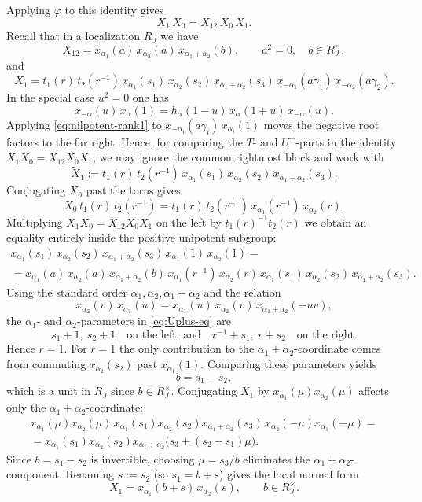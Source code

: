 \documentclass[]{jgcc}
\numberwithin{equation}{section}
\begin{document}
Applying $\varphi$ to this identity gives
\[
X_1\,X_0 = X_{12}\,X_0\,X_1.
\]
Recall that in a localization $R_J$ we have
\[
X_{12}=x_{\alpha_1}(a)\,x_{\alpha_2}(a)\,x_{\alpha_1+\alpha_2}(b),
\qquad a^2=0,\quad b\in R_J^\times,
\]
and
\[
X_1=t_1(r)\,t_2(r^{-1})\,
x_{\alpha_1}(s_1)\,x_{\alpha_2}(s_2)\,x_{\alpha_1+\alpha_2}(s_3)\,
x_{-\alpha_1}(a\gamma_1)\,x_{-\alpha_2}(a\gamma_2).
\]
In the special case $u^2=0$ one has
\begin{equation}\label{eq:nilpotent-rank1}
x_{-\alpha}(u)\,x_{\alpha}(1)
= h_{\alpha}(1-u)\,x_{\alpha}(1+u)\,x_{-\alpha}(u).
\end{equation}
Applying \eqref{eq:nilpotent-rank1} to $x_{-\alpha_i}(a\gamma_i)\,x_{\alpha_i}(1)$ moves the negative root factors to the far right. Hence, for comparing the $T$- and $U^+$-parts in the identity $X_1X_0=X_{12}X_0X_1$, we may ignore the common rightmost block and work with
\[
\widetilde X_1:=t_1(r)\,t_2(r^{-1})\,x_{\alpha_1}(s_1)\,x_{\alpha_2}(s_2)\,x_{\alpha_1+\alpha_2}(s_3).
\]
Conjugating $X_0$ past the torus gives
\[
X_0\,t_1(r)\,t_2(r^{-1})
= t_1(r)\,t_2(r^{-1})\,x_{\alpha_1}(r^{-1})\,x_{\alpha_2}(r).
\]
Multiplying $X_1X_0=X_{12}X_0X_1$ on the left by $t_1(r)^{-1}t_2(r)$
we obtain an equality entirely inside the positive unipotent subgroup:
\begin{multline}\label{eq:Uplus-eq}
x_{\alpha_1}(s_1)\,x_{\alpha_2}(s_2)\,x_{\alpha_1+\alpha_2}(s_3)\,x_{\alpha_1}(1)\,x_{\alpha_2}(1)
=\\
=x_{\alpha_1}(a)\,x_{\alpha_2}(a)\,x_{\alpha_1+\alpha_2}(b)\,
x_{\alpha_1}(r^{-1})\,x_{\alpha_2}(r)\,
x_{\alpha_1}(s_1)\,x_{\alpha_2}(s_2)\,x_{\alpha_1+\alpha_2}(s_3).
\end{multline}
Using the standard order $\alpha_1,\alpha_2,\alpha_1+\alpha_2$ and the relation
$$
x_{\alpha_2}(v)\,x_{\alpha_1}(u)
= x_{\alpha_1}(u)\,x_{\alpha_2}(v)\,x_{\alpha_1+\alpha_2}(- uv),
$$
the $\alpha_1$- and $\alpha_2$-parameters in \eqref{eq:Uplus-eq} are
\[
s_1+1,\ s_2+1\quad\text{on the left, and}\quad r^{-1}+s_1,\ r+s_2\quad\text{on the right.}
\]
Hence $r=1$.
For $r=1$ the only contribution to the $\alpha_1+\alpha_2$-coordinate comes from commuting $x_{\alpha_2}(s_2)$ past $x_{\alpha_1}(1)$.
Comparing these parameters yields
\[
b=s_1-s_2,
\]
which is a unit in $R_J$ since $b\in R_J^\times$.
Conjugating $X_1$ by $x_{\alpha_1}(\mu)x_{\alpha_2}(\mu)$ affects only the $\alpha_1+\alpha_2$-coordinate:
\begin{multline*}
x_{\alpha_1}(\mu)x_{\alpha_2}(\mu)
\,x_{\alpha_1}(s_1)x_{\alpha_2}(s_2)x_{\alpha_1+\alpha_2}(s_3)\,
x_{\alpha_2}(-\mu)x_{\alpha_1}(-\mu)
=\\
=x_{\alpha_1}(s_1)x_{\alpha_2}(s_2)
  x_{\alpha_1+\alpha_2}\bigl(s_3+(s_2-s_1)\mu\bigr).
\end{multline*}
Since $b=s_1-s_2$ is invertible, choosing $\mu=s_3/b$ eliminates the $\alpha_1+\alpha_2$-component.
Renaming $s:=s_2$ (so $s_1=b+s$) gives the local normal form
\[
X_1=x_{\alpha_1}(b+s)\,x_{\alpha_2}(s),
\qquad  b\in R_J^\times.
\]
\end{document}
